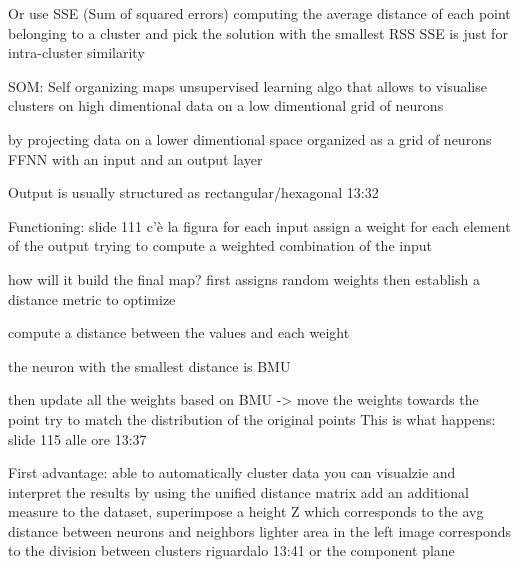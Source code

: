                         Or use SSE (Sum of squared errors) computing the average distance of each point belonging to a cluster 
                        and pick the solution with the smallest RSS 
                        SSE is just for intra-cluster similarity 
                
                SOM: Self organizing maps 
                    unsupervised learning algo that allows to visualise clusters on high dimentional data on a low dimentional grid of neurons 

                    by projecting data on a lower dimentional space organized as a grid of neurons 
                    FFNN with an input and an output layer 

                    Output is usually structured as rectangular/hexagonal 13:32

                    Functioning: slide 111 c'è la figura 
                        for each input assign a weight for each element of the output
                        trying to compute a weighted combination of the input 

                        how will it build the final map?
                            first assigns random weights 
                            then establish a distance metric to optimize

                            compute a distance between the values and each weight 

                            the neuron with the smallest distance is BMU 

                            then update all the weights based on BMU -> move the weights towards the point 
                            try to match the distribution of the original points 
                            This is what happens: slide 115 alle ore 13:37 

                            First advantage:
                                able to automatically cluster data 
                                you can visualzie and interpret the results 
                                    by using the unified distance matrix
                                        add an additional measure to the dataset, superimpose a height Z which corresponds to the avg distance between neurons and neighbors 
                                        lighter area in the left image corresponds to the division between clusters 
                                        riguardalo 13:41
                                    or the component plane 


                    


